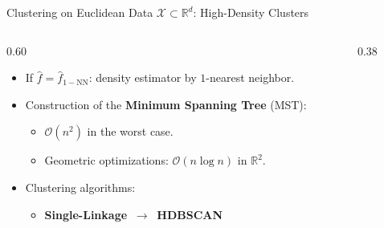 \documentclass[A4,svgnames,9pt,aspectratio=169]{beamer}
\begin{document}
\begin{frame}{Clustering on Euclidean Data $\mathcal{X} \subset \mathbb{R}^d$: High-Density Clusters}
    \begin{columns}[c, onlytextwidth]
        \begin{column}{0.60\textwidth}
            \begin{itemize}
                \setlength{\itemsep}{12pt}
                \item If \textbf{$\widehat{f} = \widehat{f}_{1-\text{NN}}$}: density estimator by $1$-nearest neighbor.
                \item Construction of the \textbf{Minimum Spanning Tree} (MST):
                \begin{itemize}
                    \setlength{\itemsep}{6pt}
                    \item $\mathcal{O}(n^2)$ in the worst case.
                    \item Geometric optimizations: $\mathcal{O}(n \log n)$ in $\mathbb{R}^2$.
                \end{itemize}
                \item Clustering algorithms:
                \begin{itemize}
                    \item \textbf{Single-Linkage} $\ \longrightarrow\ $ \textbf{HDBSCAN}
                \end{itemize}
            \end{itemize}
        \end{column}
        
        \begin{column}{0.38\textwidth}
            \begin{center}
\end{center}
\end{column}
\end{columns}
\end{frame}
\end{document}

